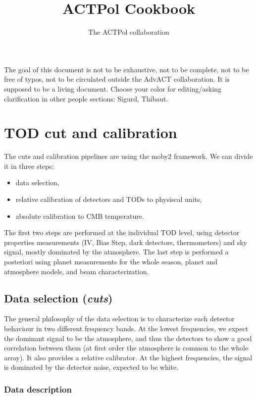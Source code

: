 \documentclass[a4paper, 11pt]{article}
\newcommand{\skn}[1]{{\color{red}#1}}
\newcommand{\TIB}[1]{{\color{blue}#1}}
\begin{document}
\title{\textbf{ACTPol Cookbook}}
\author{The ACTPol collaboration}
\maketitle

The goal of this document is not to be exhaustive, not to be complete, not
to be free of typos, not to be circulated outside the AdvACT collaboration.
It is supposed to be a living document.  Choose your color for
editing/asking clarification in other people sections: \skn{Sigurd}, \TIB{Thibaut}.

\section{TOD cut and calibration}

The cuts and calibration pipelines are using the moby2 framework. We can divide it in three steps:
\begin{itemize}
\item data selection,
\item relative calibration of detectors and TODs to physiscal units,
\item absolute calibration to CMB temperature.
\end{itemize}
The first two steps are performed at the individual TOD level, using detector properties measurements (IV, Bias Step, dark detectors, thermometers) and sky signal, mostly dominated by the atmosphere. The last step is performed a posteriori using planet measurements for the whole season, planet and atmosphere models, and beam characterization.



\subsection{Data selection (\emph{cuts})}
The general philosophy of the data selection is to characterize each detector behaviour in two different frequency bands. At the lowest frequencies, we expect the dominant signal to be the atmosphere, and thus the detectors to show a good correlation between them (at first order the atmosphere is common to the whole array). It also provides a relative calibrator. At the highest frequencies, the signal is dominated by the detector noise, expected to be white.

\subsubsection{Data description}
\end{document}
